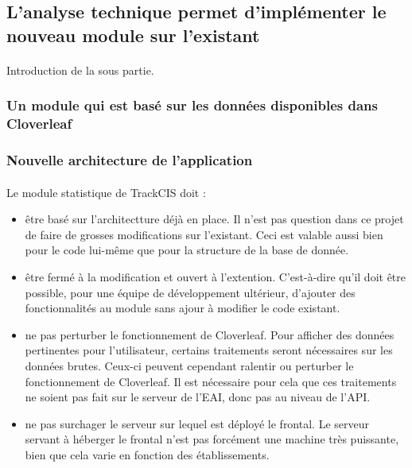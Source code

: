 	\subsection{L'analyse technique permet d'implémenter le nouveau module sur
	l'existant}
		\paragraph{}
		Introduction de la sous partie.
		
		\subsubsection{Un module qui est basé sur les données disponibles dans
		Cloverleaf}
		\subsubsection{Nouvelle architecture de l'application}
			\paragraph{}%
			Le module statistique de TrackCIS doit :
			\begin{itemize}%
			  \item être basé sur l'architectture déjà en place. Il n'est pas question
			  dans ce projet de faire de grosses modifications sur l'existant. Ceci est
			  valable aussi bien pour le code lui-même que pour la structure de la base
			  de donnée.
			  \item être fermé à la modification et ouvert à l'extention. C'est-à-dire
			  qu'il doit être possible, pour une équipe de développement ultérieur,
			  d'ajouter des fonctionnalités au module sans ajour à modifier le code
			  existant.
			  \item ne pas perturber le fonctionnement de Cloverleaf. Pour afficher des
			  données pertinentes pour l'utilisateur, certains traitements seront
			  nécessaires sur les données brutes. Ceux-ci peuvent cependant ralentir ou
			  perturber le fonctionnement de Cloverleaf. Il est nécessaire pour cela que
			  ces traitements ne soient pas fait sur le serveur de l'EAI, donc pas au
			  niveau de l'API.
			  \item ne pas surchager le serveur sur lequel est déployé le frontal. Le
			  serveur servant à héberger le frontal n'est pas forcément une machine très
			  puissante, bien que cela varie en fonction des établissements.
			\end{itemize}
			
